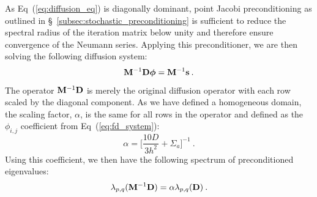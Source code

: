 As Eq~(\ref{eq:diffusion_eq}) is diagonally dominant, point Jacobi
preconditioning as outlined in
\S~\ref{subsec:stochastic_preconditioning} is sufficient to reduce the
spectral radius of the iteration matrix below unity and therefore
ensure convergence of the Neumann series. Applying this
preconditioner, we are then solving the following diffusion system:
\begin{equation}
  \mathbf{M}^{-1} \mathbf{D} \boldsymbol{\phi} = \mathbf{M}^{-1} \mathbf{s}\:.
  \label{eq:precond_diffsion}
\end{equation}
The operator $\mathbf{M}^{-1} \mathbf{D}$ is merely the original diffusion
operator with each row scaled by the diagonal component. As we have
defined a homogeneous domain, the scaling factor, $\alpha$, is the
same for all rows in the operator and defined as the $\phi_{i,j}$
coefficient from Eq~(\ref{eq:fd_system}):
\begin{equation}
  \alpha = \Bigg[\frac{10 D}{3 h^2} + \Sigma_a\Bigg]^{-1}\:.
  \label{eq:jacobi_scaling}
\end{equation}
Using this coefficient, we then have the following spectrum of
preconditioned eigenvalues:
\begin{equation}
  \lambda_{p,q}(\mathbf{M}^{-1} \mathbf{D}) = \alpha \lambda_{p,q}(\mathbf{D})\:.
  \label{eq:preconditioned_eigenvalues}
\end{equation}


